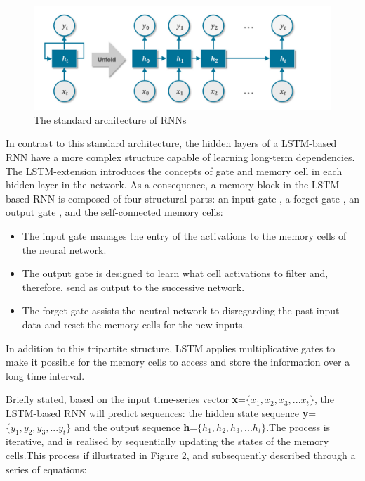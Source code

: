 \documentclass[10pt,twocolumn,letterpaper]{article}
\begin{document}
\begin{figure}[h]
   \includegraphics[width=\linewidth]{RNN}
   \caption{The standard architecture of RNNs}
\end{figure}

In contrast to this standard architecture, the hidden layers of a LSTM-based RNN have a more complex structure capable of learning long-term dependencies. The LSTM-extension introduces the concepts of gate and memory cell in each hidden layer in the network. As a consequence, a memory block in the LSTM-based RNN is composed of four structural parts: an input gate , a forget gate , an output gate , and the self-connected memory cells:
\begin{itemize}
    \item The input gate manages the entry of the activations to the memory cells of the neural network.
    \item The output gate is designed to learn what cell activations to filter and, therefore, send as output to the successive network.
    \item The forget gate assists the neutral network to disregarding the past input data and reset the memory cells for the new inputs.
\end{itemize}
In addition to this tripartite structure, LSTM applies multiplicative gates to make it possible for the memory cells to access and store the information over a long time interval.


Briefly stated, based on the input time-series vector \textbf{x}=$\{x_1,x_2,x_3,...x_t\}$, the LSTM-based RNN will predict sequences: the hidden state sequence  \textbf{y}=$\{y_1,y_2,y_3,...y_t\}$ and the output sequence \textbf{h}=$\{h_1,h_2,h_3,...h_t\}$.The process is iterative, and is realised by sequentially updating the states of the memory cells.This process if illustrated in Figure 2, and subsequently described through a series of equations:
\end{document}
